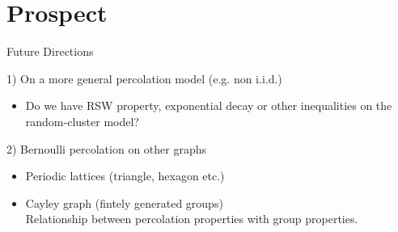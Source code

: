 \documentclass{beamer}
\begin{document}
    



\section{Prospect}

\begin{frame}{Future Directions}
    \begin{exampleblock}{1) On a more general percolation model (e.g. non i.i.d.)}
    \begin{itemize}
        \item Do we have RSW property, exponential decay or other inequalities on the random-cluster model?
    \end{itemize}
    \end{exampleblock}
    \begin{exampleblock}{2) Bernoulli percolation on other graphs}
        \begin{itemize}
            \item Periodic lattices (triangle, hexagon etc.)
            \item Cayley graph (fintely generated groups)\\
                Relationship between percolation properties with group properties.
        \end{itemize}
    \end{exampleblock}
    
    
\end{frame}


%    
%    


    
\end{document}
